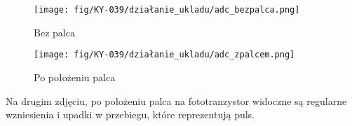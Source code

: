 \documentclass[11pt, a4paper]{article}
\begin{document}
\newpage
\vspace{0.5cm}
\begin{figure}[h]
  \centering
  \texttt{[image: fig/KY-039/działanie\_ukladu/adc\_bezpalca.png]}
  \caption{Bez palca}
\end{figure}
\begin{figure}[h]
  \centering
    \texttt{[image: fig/KY-039/działanie\_ukladu/adc\_zpalcem.png]}
      \caption{Po położeniu palca }
\end{figure}
\vspace{0.5cm}

Na drugim zdjęciu, po położeniu palca na fototranzystor widoczne są regularne wzniesienia i upadki w przebiegu, które reprezentują puls. 
\newpage
\printbibliography[heading=bibintoc]
\end{document}
